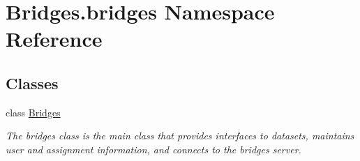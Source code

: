 \hypertarget{namespace_bridges_1_1bridges}{}\section{Bridges.\+bridges Namespace Reference}
\label{namespace_bridges_1_1bridges}
\subsection*{Classes}
\begin{DoxyCompactItemize}
\item 
class \hyperlink{class_bridges_1_1bridges_1_1_bridges}{Bridges}
\begin{DoxyCompactList}\small\item\em The bridges class is the main class that provides interfaces to datasets, maintains user and assignment information, and connects to the bridges server. \end{DoxyCompactList}\end{DoxyCompactItemize}
